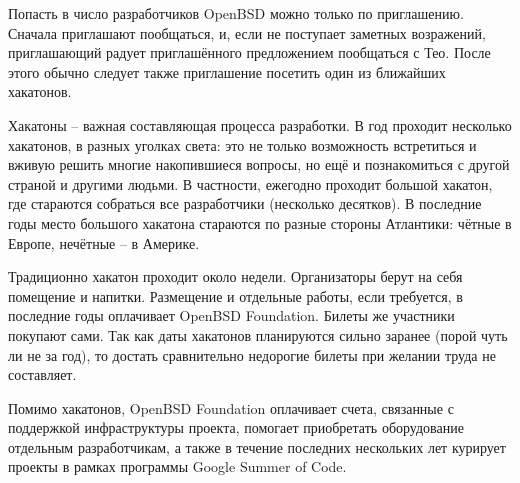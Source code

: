 \documentclass[10pt, a5paper]{article}
\begin{document}
Попасть в число разработчиков OpenBSD можно только по приглашению. Сначала приглашают пообщаться, и, если не поступает заметных возражений, приглашающий радует приглашённого предложением пообщаться с Тео. После этого обычно следует также приглашение посетить один из ближайших хакатонов.

Хакатоны -- важная составляющая процесса разработки. В год проходит несколько хакатонов, в разных уголках света: это не только возможность встретиться и вживую решить многие накопившиеся вопросы, но ещё и познакомиться с другой страной и другими людьми. В частности, ежегодно проходит большой хакатон, где стараются собраться все разработчики (несколько десятков). В последние годы место большого хакатона стараются по разные стороны Атлантики: чётные в Европе, нечётные -- в Америке.

Традиционно хакатон проходит около недели. Организаторы берут на себя помещение и напитки. Размещение и отдельные работы, если требуется, в последние годы оплачивает OpenBSD Foundation. Билеты же участники покупают сами. Так как даты хакатонов планируются сильно заранее (порой чуть ли не за год), то достать сравнительно недорогие билеты при желании труда не составляет.

Помимо хакатонов, OpenBSD Foundation оплачивает счета, связанные с поддержкой инфраструктуры проекта, помогает приобретать оборудование отдельным разработчикам, а также в течение последних нескольких лет курирует проекты в рамках программы Google Summer of Code.
\end{document}
